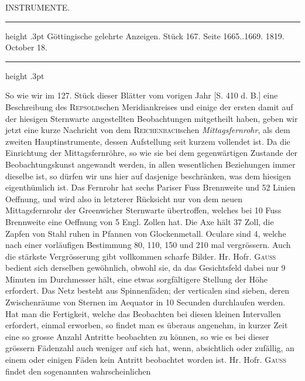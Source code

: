 \par\bigskip
{}
\hypertarget{native-427-part-lower}{}
\begin{center}
\Large INSTRUMENTE.
\end{center}
\begin{center}
\parbox{.81\linewidth}{%
\centering\small
\hrule height .3pt\relax\vspace{2.5pt}
Göttingische gelehrte Anzeigen. Stück 167. Seite 1665..1669. 1819. October 18.\par
\vspace{2.5pt}\hrule height .3pt\relax
}
\end{center}

So wie wir im 127. Stück dieser Blätter vom vorigen Jahr [S. 410 d. B.] eine Beschreibung des
\textsc{Repsold}schen Meridiankreises und einige der ersten damit auf der hiesigen Sternwarte angestellten
Beobachtungen mitgetheilt haben, geben wir jetzt eine kurze Nachricht von dem \textsc{Reichenbach}schen
\emph{Mittagsfernrohr}, als dem zweiten Hauptinstrumente, dessen Aufstellung seit kurzem vollendet ist. Da
die Einrichtung der Mittagsfernröhre, so wie sie bei dem gegenwärtigen Zustande der Beobachtungskunst
angewandt werden, in allen wesentlichen Beziehungen immer dieselbe ist, so dürfen wir uns hier auf
dasjenige beschränken, was dem hiesigen eigenthümlich ist. Das Fernrohr hat sechs Pariser
Fuss Brennweite und 52 Linien Oeffnung, und wird also in letzterer Rücksicht nur von dem neuen Mittagsfernrohr
der Greenwicher Sternwarte übertroffen, welches bei 10 Fuss Brennweite eine Oeffnung von
5 Engl. Zollen hat. Die Axe hält 37 Zoll, die Zapfen von Stahl ruhen in Pfannen von Glockenmetall.
Oculare sind 4, welche nach einer vorläufigen Bestimmung 80, 110, 150 und 210 mal vergrössern. Auch
die stärkste Vergrösserung gibt vollkommen scharfe Bilder. Hr. Hofr. \textsc{Gauss} bedient sich derselben gewöhnlich,
obwohl sie, da das Gesichtsfeld dabei nur 9 Minuten im Durchmesser hält, eine etwas sorgfältigere
Stellung der Höhe erfordert. Das Netz besteht aus Spinnenfäden; der verticalen sind sieben,
deren Zwischenräume von Sternen im Aequator in 10 Secunden durchlaufen werden. Hat man die Fertigkeit,
welche das Beobachten bei diesen kleinen Intervallen erfordert, einmal erworben, so findet man
es überaus angenehm, in kurzer Zeit eine so grosse Anzahl Antritte beobachten zu können, so wie es
bei dieser grössern Fädenzahl auch weniger auf sich hat, wenn, absichtlich oder zufällig, an einem
oder einigen Fäden kein Antritt beobachtet worden ist. Hr. Hofr. \textsc{Gauss} findet den sogenannten wahrscheinlichen
